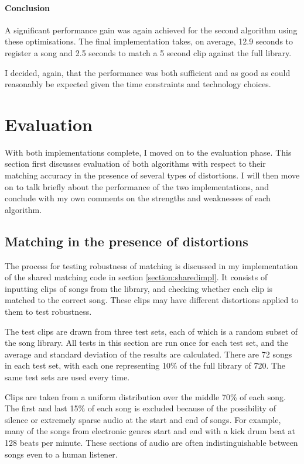 \documentclass[12pt,a4paper,twoside,openright]{report}
\begin{document}
\subsubsection{Conclusion}

A significant performance gain was again achieved for the second algorithm using these optimisations. The final implementation takes, on average, 12.9 seconds to register a song and 2.5 seconds to match a 5 second clip against the full library.

I decided, again, that the performance was both sufficient and as good as could reasonably be expected given the time constraints and technology choices.



\chapter{Evaluation}
\label{evaluation}

With both implementations complete, I moved on to the evaluation phase. This section first discusses evaluation of both algorithms with respect to their matching accuracy in the presence of several types of distortions. I will then move on to talk briefly about the performance of the two implementations, and conclude with my own comments on the strengths and weaknesses of each algorithm.


\section{Matching in the presence of distortions}
\label{evaluation:matching_with_distortion}

The process for testing robustness of matching is discussed in my implementation of the shared matching code in section \ref{section:sharedimpl}. It consists of inputting clips of songs from the library, and checking whether each clip is matched to the correct song. These clips may have different distortions applied to them to test robustness.

The test clips are drawn from three test sets, each of which is a random subset of the song library. All tests in this section are run once for each test set, and the average and standard deviation of the results are calculated. There are 72 songs in each test set, with each one representing 10\% of the full library of 720. The same test sets are used every time.

Clips are taken from a uniform distribution over the middle 70\% of each song. The first and last 15\% of each song is excluded because of the possibility of silence or extremely sparse audio at the start and end of songs. For example, many of the songs from electronic genres start and end with a kick drum beat at 128 beats per minute. These sections of audio are often indistinguishable between songs even to a human listener.
\end{document}
